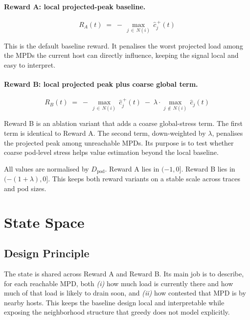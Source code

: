 \documentclass[11pt]{article}
\begin{document}
\paragraph{Reward A: local projected-peak baseline.}
\begin{equation}
\boxed{
    R_A(t)
    \;=\;
    -\,\max_{j \,\in\, N(i)}\, \hat{c}_j^{\,+}(t)
}
\label{eq:reward-a}
\end{equation}

This is the default baseline reward.  It penalises the worst projected
load among the MPDs the current host can directly influence, keeping the
signal local and easy to interpret.

\paragraph{Reward B: local projected peak plus coarse global term.}
\begin{equation}
\boxed{
    R_B(t)
    \;=\;
    -\,\max_{j \,\in\, N(i)}\, \hat{c}_j^{\,+}(t)
    \;-\;
    \lambda \cdot \max_{j \,\notin\, N(i)}\, \hat{c}_j(t)
}
\label{eq:reward-b}
\end{equation}

Reward B is an ablation variant that adds a coarse global-stress term.
The first term is identical to Reward A.  The second term, down-weighted
by $\lambda$, penalises the projected peak among unreachable MPDs.  Its
purpose is to test whether coarse pod-level stress helps value
estimation beyond the local baseline.

All values are normalised by $D_\mathrm{pod}$.  Reward A lies in
$(-1, 0]$.  Reward B lies in $(-(1+\lambda), 0]$.  This keeps both
reward variants on a stable scale across traces and pod sizes.

\section{State Space}
\label{sec:state}

\subsection{Design Principle}

The state is shared across Reward A and Reward B.  Its main job is to
describe, for each reachable MPD, both
\emph{(i)} how much load is currently there and how much of that load is
likely to drain soon, and
\emph{(ii)} how contested that MPD is by nearby hosts.
This keeps the baseline design local and interpretable while exposing
the neighborhood structure that greedy does not model explicitly.
\end{document}
